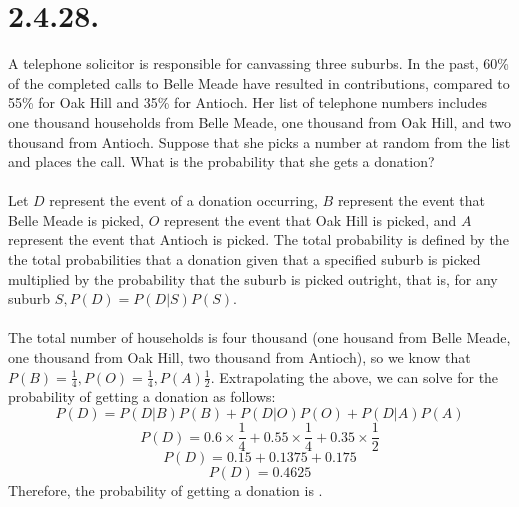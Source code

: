 \documentclass{article}
\begin{document}
{\section*{2.4.28.} 
A telephone solicitor is responsible for canvassing three suburbs. In the past, 60\% of the completed calls to Belle Meade have resulted in contributions, compared to 55\% for Oak Hill and 35\% for Antioch. Her list of telephone numbers includes one thousand households from Belle Meade, one thousand from Oak Hill, and two thousand from Antioch. Suppose that she picks a number at random from the list and places the call. What is the probability that she gets a donation?
\\
\\ 
Let \(D\) represent the event of a donation occurring, \(B\) represent the event that Belle Meade is picked, \(O\) represent the event that Oak Hill is picked, and \(A\) represent the event that Antioch is picked. The total probability is defined by the the total probabilities that a donation given that a specified suburb is picked multiplied by the probability that the suburb is picked outright, that is, for any suburb \(S, P(D) = P(D|S)P(S)\). \\ \\
The total number of households is four thousand (one housand from Belle Meade, one thousand from Oak Hill, two thousand from Antioch), so we know that \(P(B) = \frac{1}{4}, P(O) = \frac{1}{4}, P(A) \frac{1}{2}\). Extrapolating the above, we can solve for the probability of getting a donation as follows: \\
\[
P(D)=P(D|B)P(B)+P(D|O)P(O)+P(D|A)P(A)
\]
\[
P(D)=0.6 \times \frac{1}{4} + 0.55 \times \frac{1}{4} + 0.35 \times \frac{1}{2}
\]
\[
P(D)= 0.15 + 0.1375 + 0.175
\]
\[
P(D)= 0.4625
\]
Therefore, the probability of getting a donation is .

}
\end{document}
